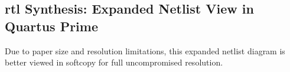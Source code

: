 \begin{appendices}
	\section{\acs{rtl} Synthesis: Expanded Netlist View in Quartus Prime}\label{app:rtl}
	Due to paper size and resolution limitations, this expanded netlist diagram is better viewed in softcopy for full uncompromised resolution.

	\begin{minipage}[t][][b]{\linewidth}
		
	\end{minipage}
\end{appendices}